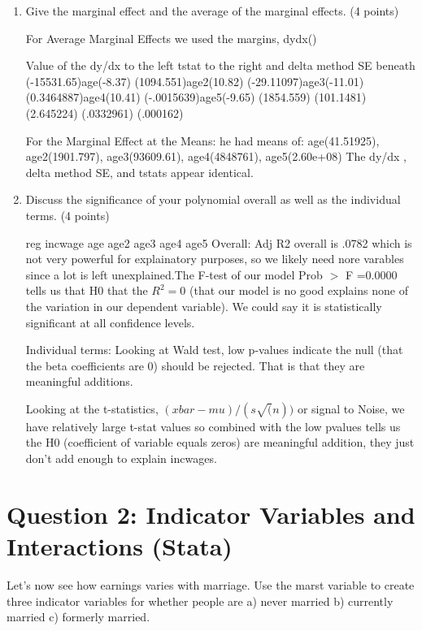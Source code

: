 \documentclass{article}
\begin{document}
\begin{enumerate}[label=\alph*]
\item  Give the marginal effect and the average of the marginal effects.  (4 points)

For Average Marginal Effects we used the margins, dydx()

Value of the dy/dx to the left tstat to the right and delta method SE beneath
(-15531.65)age(-8.37)     (1094.551)age2(10.82)    (-29.11097)age3(-11.01)    (0.3464887)age4(10.41)    (-.0015639)age5(-9.65)
        (1854.559)               (101.1481)                (2.645224)                 (.0332961)                (.000162)

For the Marginal Effect at the Means:
he had means of: age(41.51925), age2(1901.797), age3(93609.61), age4(4848761), age5(2.60e+08)
The dy/dx , delta method SE, and tstats appear identical.


\item  Discuss the significance of your polynomial overall as well as the individual terms.  (4 points)


reg incwage age age2 age3 age4 age5 Overall: Adj R2 overall is .0782 which is not very powerful for explainatory purposes, so we likely need nore varables since a lot is left unexplained.The F-test of our model Prob ${>}$ F =0.0000 tells us that H0 that the $R^{2}=0$ (that our model is no good explains none of the variation in our dependent variable). We could say it is statistically significant at all confidence levels.

Individual terms: Looking at Wald test, low p-values indicate the null (that the beta coefficients are 0) should be rejected. That is that they are meaningful additions.

Looking at the t-statistics, $(xbar - mu)/ (s\sqrt(n))$ or signal to Noise, we have relatively large t-stat values so combined with the low pvalues tells us the H0 (coefficient of variable equals zeros) are meaningful addition, they just don't add enough to explain incwages.

\end{enumerate}

\section{Question 2:  Indicator Variables and Interactions  (Stata)}
Let’s now see how earnings varies with marriage. Use the marst variable to create
three indicator variables for whether people are a) never married b) currently married c) formerly married.
\end{document}
